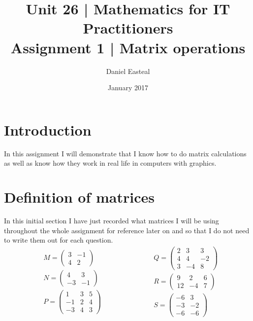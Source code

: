 \documentclass{article}
\begin{document}
\title{Unit 26 | Mathematics for IT Practitioners \\ \vspace{1.5cm} Assignment 1 | Matrix operations}
\author{Daniel Easteal}
\date{January 2017}
\maketitle
\newpage
\tableofcontents
\newpage
\section{Introduction}
In this assignment I will demonstrate that I know how to do matrix calculations as well as know how they work in real life in computers with graphics. 
\section{Definition of matrices}
In this initial section I have just recorded what matrices I will be using throughout the whole assignment for reference later on and so that I do not need to write them out for each question.
\begin{equation*}
	\begin{split}
	&M =
	\begin{pmatrix}
		3 & -1\\
		4 & 2
	\end{pmatrix}
	\\
	&N =
	\begin{pmatrix}
		4 & 3\\
		-3 & -1
	\end{pmatrix}
	\\
	&P =
	\begin{pmatrix}
		1 & 3 & 5\\
		-1 & 2 & 4\\
		-3 & 4 & 3
	\end{pmatrix}
\end{split}
\qquad
\qquad
\qquad
\begin{split}
	&Q =
	\begin{pmatrix}
		2 & 3 & 3\\
		4 & 4 & -2\\
		3 & -4 & 8
	\end{pmatrix}
	\\
	&R = 
	\begin{pmatrix}
		9 & 2 & 6\\
		12 & -4 & 7
	\end{pmatrix}
	\\
	&S =
	\begin{pmatrix}
		-6 & 3\\
		-3 & -2\\
		-6 & -6
	\end{pmatrix}
\end{split}
\end{equation*}
\end{document}
